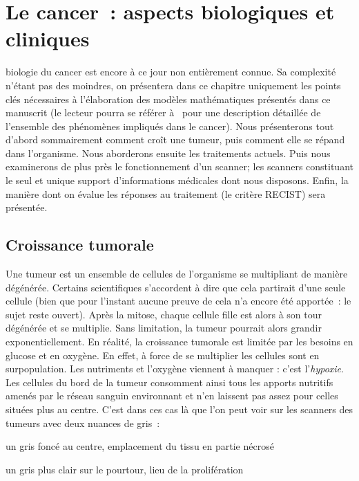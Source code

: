 \documentclass[main.tex]{subfiles}
\begin{document}
\chapter{Le cancer~: aspects biologiques et cliniques \label{chap:biologie_du_cancer}}%
 biologie du cancer est encore à ce jour non entièrement connue. 
Sa complexité n'étant pas des moindres, on présentera dans ce chapitre uniquement les points clés nécessaires à l'élaboration des modèles mathématiques présentés dans ce manuscrit (le lecteur pourra se référer à~\cite{bast2000tumor} pour une description détaillée de l'ensemble des phénomènes impliqués dans le cancer). 
Nous présenterons tout d'abord sommairement comment croît une tumeur, puis comment elle se répand dans l'organisme. Nous aborderons ensuite les traitements actuels. Puis nous examinerons de plus près le fonctionnement d'un scanner; les scanners constituant le seul et unique support d'informations médicales dont nous disposons. Enfin, la manière dont on évalue les réponses au traitement (le critère RECIST) sera présentée.

\section{Croissance tumorale}
Une tumeur est un ensemble de cellules de l'organisme se multipliant de manière dégénérée. %
Certains scientifiques s'accordent à dire que cela partirait d'une seule cellule (bien que pour l'instant aucune preuve de cela n'a encore été apportée~: le sujet reste ouvert). 
Après la mitose, chaque cellule fille est alors à son tour dégénérée et se multiplie. %
Sans limitation, la tumeur pourrait alors grandir exponentiellement. 
En réalité, la croissance tumorale est limitée par les besoins en glucose et en oxygène. 
En effet, à force de se multiplier les cellules sont en surpopulation. 
Les nutriments et l'oxygène viennent à manquer : c'est l'\emph{hypoxie}. 
Les cellules du bord de la tumeur consomment ainsi tous les apports nutritifs amenés par le réseau sanguin environnant et n'en laissent pas assez pour celles situées plus au centre. 
C'est dans ces cas là que l'on peut voir sur les scanners des tumeurs avec deux nuances de gris~:
\begin{myitemize}
\item un gris foncé au centre, emplacement du tissu en partie nécrosé
\item un gris plus clair sur le pourtour, lieu de la prolifération
\end{myitemize}
\end{document}
